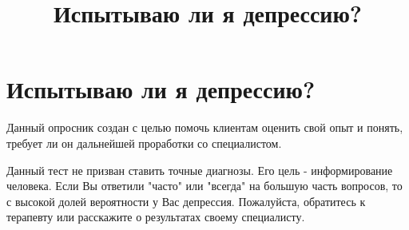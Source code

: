 \documentclass{../../shared/survey}
\title{Испытываю ли я депрессию?}
\begin{document}
\section*{\huge{Испытываю ли я депрессию?}}

\begin{flushleft}
    Данный опросник создан с целью помочь клиентам оценить свой опыт и понять, требует ли он дальнейшей проработки со специалистом.
\end{flushleft}






\begin{flushleft}
    Данный тест не призван ставить точные диагнозы. Его цель - информирование человека. Если Вы ответили "часто" или "всегда" на большую часть вопросов, то с высокой долей вероятности у Вас депрессия. Пожалуйста, обратитесь к терапевту или расскажите о результатах своему специалисту.
\end{flushleft}
\end{document}
